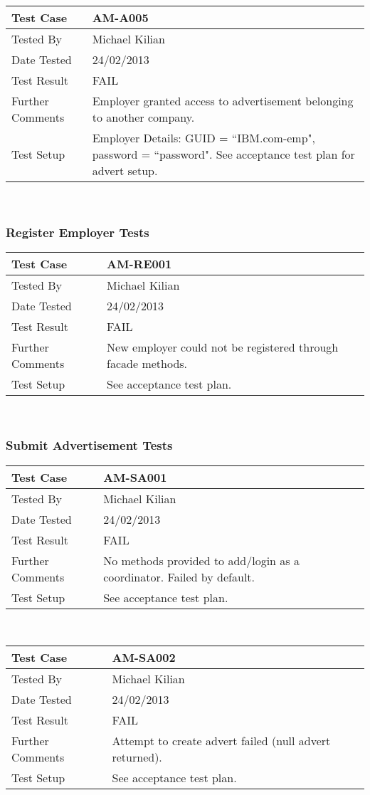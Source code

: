 \documentclass{l3deliverable}
\begin{document}
\begin{tabular}{lp{10cm}}
\hline 
\textbf{Test Case} & AM-A005\tabularnewline
\hline 
\hline 
Tested By & Michael Kilian\tabularnewline
\hline 
Date Tested & 24/02/2013\tabularnewline
\hline 
Test Result & FAIL\tabularnewline
\hline
Further Comments & Employer granted access to advertisement belonging to another company.\tabularnewline
\hline
Test Setup & Employer Details: GUID = ``IBM.com-emp", password = ``password". See acceptance test plan for advert setup.\tabularnewline
\hline
\end{tabular}\\

\subsubsection{Register Employer Tests}
\begin{tabular}{lp{10cm}}
\hline 
\textbf{Test Case} & AM-RE001\tabularnewline
\hline 
\hline 
Tested By & Michael Kilian\tabularnewline
\hline 
Date Tested & 24/02/2013\tabularnewline
\hline 
Test Result & FAIL\tabularnewline
\hline
Further Comments & New employer could not be registered through facade methods. \tabularnewline
\hline
Test Setup &  See acceptance test plan.\tabularnewline
\hline
\end{tabular}\\

\subsubsection{Submit Advertisement Tests}
\begin{tabular}{lp{10cm}}
\hline 
\textbf{Test Case} & AM-SA001\tabularnewline
\hline 
\hline 
Tested By & Michael Kilian\tabularnewline
\hline 
Date Tested & 24/02/2013\tabularnewline
\hline 
Test Result & FAIL\tabularnewline
\hline
Further Comments & No methods provided to add/login as a coordinator. Failed by default. \tabularnewline
\hline
Test Setup &  See acceptance test plan.\tabularnewline
\hline
\end{tabular}\\

\begin{tabular}{lp{10cm}}
\hline 
\textbf{Test Case} & AM-SA002\tabularnewline
\hline 
\hline 
Tested By & Michael Kilian\tabularnewline
\hline 
Date Tested & 24/02/2013\tabularnewline
\hline 
Test Result & FAIL\tabularnewline
\hline
Further Comments & Attempt to create advert failed (null advert returned). \tabularnewline
\hline
Test Setup &  See acceptance test plan.\tabularnewline
\hline
\end{tabular}\\
\end{document}
